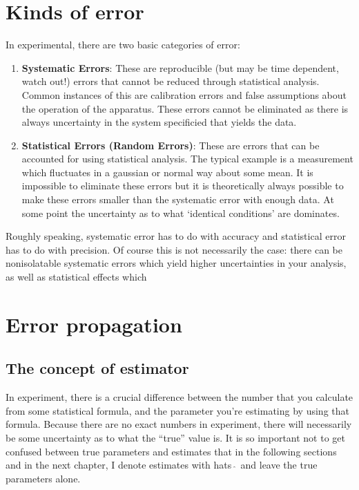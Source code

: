 \section{Kinds of error}

In experimental, there are two basic categories of error:

\begin{enumerate}
\item { \bf Systematic Errors}: These are reproducible (but may be time dependent, watch out!) errors that cannot be reduced through statistical analysis. Common instances of this are calibration errors and false assumptions about the operation of the apparatus. These errors cannot be eliminated as there is always uncertainty in the system specificied that yields the data. 
\item { \bf Statistical Errors (Random Errors)}: These are errors that can be accounted for using statistical analysis. The typical example is a measurement which fluctuates in a gaussian or normal way about some mean. It is impossible to eliminate these errors but it is theoretically always possible to make these errors smaller than the systematic error with enough data. At some point the uncertainty as to what `identical conditions' are dominates.
\end{enumerate}


Roughly speaking, systematic error has to do with accuracy and statistical error has to do with precision. Of course this is not necessarily the case: there can be nonisolatable systematic errors which yield higher uncertainties in your analysis, as well as statistical effects which 



\section{Error propagation}
\subsection{The concept of estimator}

In experiment, there is a crucial difference between the number that you calculate from some statistical formula, and the parameter you're estimating by using that formula. Because there are no exact numbers in experiment, there will necessarily be some uncertainty as to what the ``true'' value is. It is so important not to get confused between true parameters and estimates that in the following sections and in the next chapter, I denote estimates with hats $\hat{\;}$ and leave the true parameters alone. 

